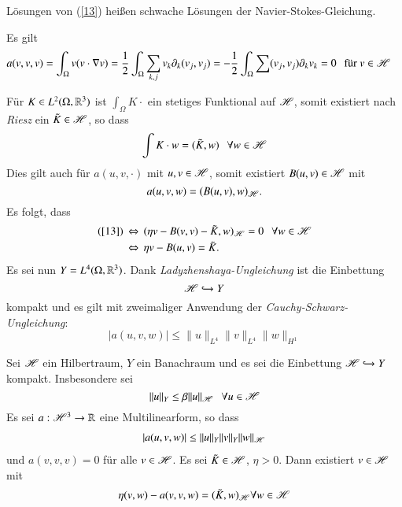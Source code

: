 Lösungen von (\ref{13}) heißen schwache Lösungen der Navier-Stokes-Gleichung.

\begin{remark}
    Es gilt
    \begin{align*}
        a(v,v,v)&=\int_\Omega v(v\cdot \nabla v)=\frac12 \int_\Omega\sum_{k,j} v_k\partial_k(v_j,v_j)
        =-\frac12 \int_\Omega\sum(v_j,v_j)\partial_kv_k=0 \hspace{.25cm} \text{für } v\in \mathscr H 
    \end{align*}
\end{remark}
Für $K\in L^2 (\Omega,\mathbb{R}^3)$ ist $\int_\Omega K \cdot$ ein stetiges Funktional auf $\mathscr H$, somit
existiert nach \textit{Riesz} ein $\tilde K \in \mathscr H$, so dass
\[
    \int K\cdot w= (\tilde K, w)  \hspace{.25cm} \forall w\in \mathscr H
\]
Dies gilt auch für $a(u,v,\cdot)$ mit $u,v\in \mathscr H$, somit existiert $B(u,v) \in \mathscr H$ mit
\[
    a(u,v,w)=(B(u,v),w)_{\mathscr H}.
\]
Es folgt, dass
\begin{align*}
    (\ref{13}) \, &\Leftrightarrow \, (\eta v - B(v,v)- \tilde K, w)_{\mathscr H}=0 \hspace{.25cm} \forall w\in \mathscr H\\
        &\Leftrightarrow \, \eta v - B(u,v)=\tilde K.
\end{align*}
Es sei nun $Y=L^4(\Omega,\mathbb{R}^3)$. Dank \textit{Ladyzhenshaya-Ungleichung} ist die Einbettung
\[
    \mathscr H \hookrightarrow Y
\]
kompakt und es gilt mit zweimaliger Anwendung der \textit{Cauchy-Schwarz-Ungleichung}:
\[
    |a(u,v,w)|\leq\|u\|_{L^4}\|v\|_{L^4}\|w\|_{H^1}
\]


\begin{theorem}\label{005}
Sei $\mathscr H$ ein Hilbertraum, $Y$ ein Banachraum und es sei die Einbettung $\mathscr H \hookrightarrow Y $
kompakt. Insbesondere sei
\[
    \|u\|_Y\leq \beta \|u\|_{\mathscr H} \hspace{.25cm} \forall u \in \mathscr H
\]
Es sei $a: \mathscr H^3 \rightarrow \mathbb{R}$ eine Multilinearform, so dass
\begin{align*}\label{14}
    |a(u,v,w)|\leq \|u\|_Y\|v\|_Y\|w\|_{\mathscr H}
\end{align*}
und $a(v,v,v)=0$ für alle $v\in \mathscr H$. Es sei $\tilde K\in \mathscr H$, $\eta >0$. Dann existiert
$v\in \mathscr H$ mit
\[
    \eta(v,w)- a(v,v,w)= (\tilde K, w)_{\mathscr H} \forall w \in \mathscr H
\]
\end{theorem}

